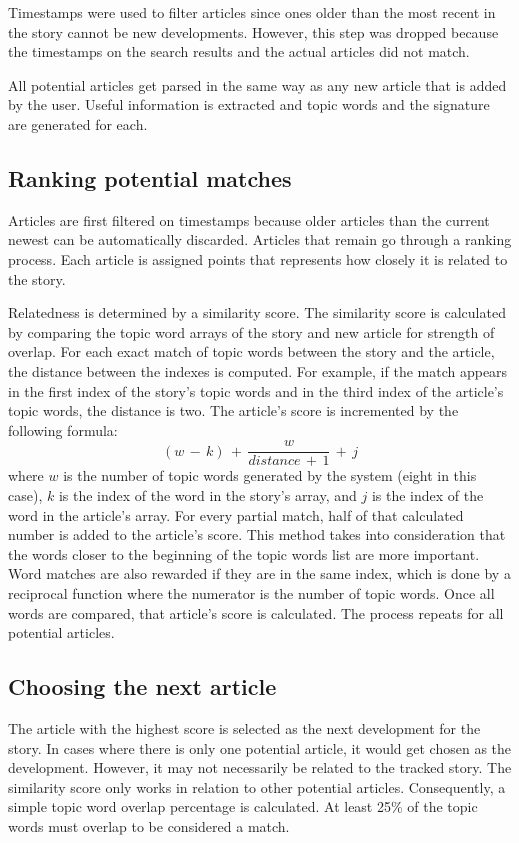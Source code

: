 \documentclass[11pt,titlepage]{report}
\begin{document}
Timestamps were used to filter articles since ones older than the most recent in the story cannot be new developments. However, this step was dropped because the timestamps on the search results and the actual articles did not match.

All potential articles get parsed in the same way as any new article that is added by the user. Useful information is extracted and topic words and the signature are generated for each.
\subsection{Ranking potential matches}
Articles are first filtered on timestamps because older articles than the current newest can be automatically discarded. Articles that remain go through a ranking process. Each article is assigned points that represents how closely it is related to the story.

Relatedness is determined by a similarity score. The similarity score is calculated by comparing the topic word arrays of the story and new article for strength of overlap. For each exact match of topic words between the story and the article, the distance between the indexes is computed. For example, if the match appears in the first index of the story's topic words and in the third index of the article's topic words, the distance is two. The article's score is incremented by the following formula: \[ (w\,-\,k)\,+\,\frac{w}{distance\,+\,1}\,+\,j\]
where $w$ is the number of topic words generated by the system (eight in this case), $k$ is the index of the word in the story's array, and $j$ is the index of the word in the article's array. For every partial match, half of that calculated number is added to the article's score. This method takes into consideration that the words closer to the beginning of the topic words list are more important. Word matches are also rewarded if they are in the same index, which is done by a reciprocal function where the numerator is the number of topic words. Once all words are compared, that article's score is calculated. The process repeats for all potential articles.
\subsection{Choosing the next article}
The article with the highest score is selected as the next development for the story. In cases where there is only one potential article, it would get chosen as the development. However, it may not necessarily be related to the tracked story. The similarity score only works in relation to other potential articles. Consequently, a simple topic word overlap percentage is calculated. At least 25\% of the topic words must overlap to be considered a match. 
\end{document}
